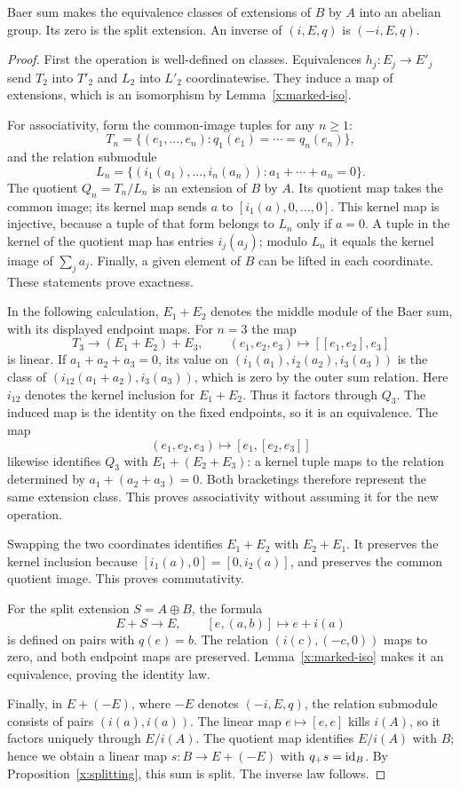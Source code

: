 \begin{proposition}\label{x:baer-group}
Baer sum makes the equivalence classes of extensions of $B$ by $A$ into
an abelian group. Its zero is the split extension. An inverse of
$(i,E,q)$ is $(-i,E,q)$.
\end{proposition}
\begin{proof}
First the operation is well-defined on classes. Equivalences
$h_j:E_j\to E'_j$ send $T_2$ into $T'_2$ and $L_2$ into $L'_2$
coordinatewise. They induce a map of extensions, which is an isomorphism
by Lemma~\ref{x:marked-iso}.

For associativity, form the common-image tuples for any $n\geq1$:
\[
T_n=\{(e_1,\ldots,e_n):q_1(e_1)=\cdots=q_n(e_n)\},
\]
and the relation submodule
\[
L_n=\{(i_1(a_1),\ldots,i_n(a_n)):a_1+\cdots+a_n=0\}.
\]
The quotient $Q_n=T_n/L_n$ is an extension of $B$ by $A$. Its quotient
map takes the common image; its kernel map sends $a$ to
$[i_1(a),0,\ldots,0]$. This kernel map is injective, because a tuple of
that form belongs to $L_n$ only if $a=0$. A tuple in the kernel of the
quotient map has entries $i_j(a_j)$; modulo $L_n$ it equals the kernel
image of $\sum_j a_j$. Finally, a given element of $B$ can be lifted in
each coordinate. These statements prove exactness.

In the following calculation, $E_1+E_2$ denotes the middle module of
the Baer sum, with its displayed endpoint maps.
For $n=3$ the map
\[
T_3\longrightarrow (E_1+E_2)+E_3,
\qquad (e_1,e_2,e_3)\longmapsto[[e_1,e_2],e_3]
\]
is linear. If $a_1+a_2+a_3=0$, its value on
$(i_1(a_1),i_2(a_2),i_3(a_3))$ is the class of
$(i_{12}(a_1+a_2),i_3(a_3))$, which is zero by the outer sum relation.
Here $i_{12}$ denotes the kernel inclusion for $E_1+E_2$.
Thus it factors through $Q_3$. The induced map is the identity on the
fixed endpoints, so it is an equivalence. The map
\[
(e_1,e_2,e_3)\longmapsto[e_1,[e_2,e_3]]
\]
likewise identifies $Q_3$ with $E_1+(E_2+E_3)$: a kernel tuple maps to
the relation determined by $a_1+(a_2+a_3)=0$. Both bracketings therefore
represent the same extension class. This proves associativity without
assuming it for the new operation.

Swapping the two coordinates identifies $E_1+E_2$ with $E_2+E_1$.
It preserves the kernel inclusion because
$[i_1(a),0]=[0,i_2(a)]$, and preserves the common quotient image.
This proves commutativity.

For the split extension $S=A\oplus B$, the formula
\[
E+S\longrightarrow E,\qquad [e,(a,b)]\longmapsto e+i(a)
\]
is defined on pairs with $q(e)=b$. The relation
$(i(c),(-c,0))$ maps to zero, and both endpoint maps are preserved.
Lemma~\ref{x:marked-iso} makes it an equivalence, proving the identity law.

Finally, in $E+(-E)$, where $-E$ denotes $(-i,E,q)$, the relation
submodule consists of pairs $(i(a),i(a))$. The linear map
$e\mapsto[e,e]$ kills $i(A)$, so it factors uniquely through $E/i(A)$.
The quotient map identifies $E/i(A)$ with $B$; hence we obtain a linear
map $s:B\to E+(-E)$ with $q_+s=\mathrm{id}_B$. By
Proposition~\ref{x:splitting}, this sum is split. The inverse law follows.
\end{proof}

